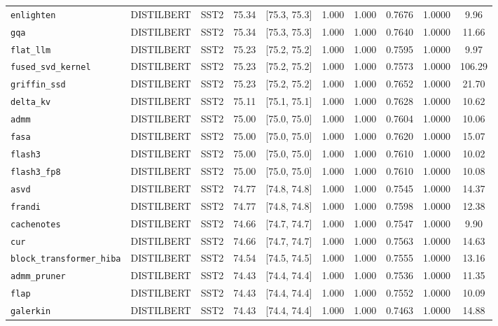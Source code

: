 \begin{table}[t]
\begin{tabular}{l l l c c c c c c c}
\texttt{enlighten} & DISTILBERT & SST2 & 75.34 & [75.3, 75.3] & 1.000 & 1.000 & 0.7676 & 1.0000 & 9.96 \\
\texttt{gqa} & DISTILBERT & SST2 & 75.34 & [75.3, 75.3] & 1.000 & 1.000 & 0.7640 & 1.0000 & 11.66 \\
\texttt{flat\_llm} & DISTILBERT & SST2 & 75.23 & [75.2, 75.2] & 1.000 & 1.000 & 0.7595 & 1.0000 & 9.97 \\
\texttt{fused\_svd\_kernel} & DISTILBERT & SST2 & 75.23 & [75.2, 75.2] & 1.000 & 1.000 & 0.7573 & 1.0000 & 106.29 \\
\texttt{griffin\_ssd} & DISTILBERT & SST2 & 75.23 & [75.2, 75.2] & 1.000 & 1.000 & 0.7652 & 1.0000 & 21.70 \\
\texttt{delta\_kv} & DISTILBERT & SST2 & 75.11 & [75.1, 75.1] & 1.000 & 1.000 & 0.7628 & 1.0000 & 10.62 \\
\texttt{admm} & DISTILBERT & SST2 & 75.00 & [75.0, 75.0] & 1.000 & 1.000 & 0.7604 & 1.0000 & 10.06 \\
\texttt{fasa} & DISTILBERT & SST2 & 75.00 & [75.0, 75.0] & 1.000 & 1.000 & 0.7620 & 1.0000 & 15.07 \\
\texttt{flash3} & DISTILBERT & SST2 & 75.00 & [75.0, 75.0] & 1.000 & 1.000 & 0.7610 & 1.0000 & 10.02 \\
\texttt{flash3\_fp8} & DISTILBERT & SST2 & 75.00 & [75.0, 75.0] & 1.000 & 1.000 & 0.7610 & 1.0000 & 10.08 \\
\texttt{asvd} & DISTILBERT & SST2 & 74.77 & [74.8, 74.8] & 1.000 & 1.000 & 0.7545 & 1.0000 & 14.37 \\
\texttt{frandi} & DISTILBERT & SST2 & 74.77 & [74.8, 74.8] & 1.000 & 1.000 & 0.7598 & 1.0000 & 12.38 \\
\texttt{cachenotes} & DISTILBERT & SST2 & 74.66 & [74.7, 74.7] & 1.000 & 1.000 & 0.7547 & 1.0000 & 9.90 \\
\texttt{cur} & DISTILBERT & SST2 & 74.66 & [74.7, 74.7] & 1.000 & 1.000 & 0.7563 & 1.0000 & 14.63 \\
\texttt{block\_transformer\_hiba} & DISTILBERT & SST2 & 74.54 & [74.5, 74.5] & 1.000 & 1.000 & 0.7555 & 1.0000 & 13.16 \\
\texttt{admm\_pruner} & DISTILBERT & SST2 & 74.43 & [74.4, 74.4] & 1.000 & 1.000 & 0.7536 & 1.0000 & 11.35 \\
\texttt{flap} & DISTILBERT & SST2 & 74.43 & [74.4, 74.4] & 1.000 & 1.000 & 0.7552 & 1.0000 & 10.09 \\
\texttt{galerkin} & DISTILBERT & SST2 & 74.43 & [74.4, 74.4] & 1.000 & 1.000 & 0.7463 & 1.0000 & 14.88 \\

\end{tabular}
\end{table}
